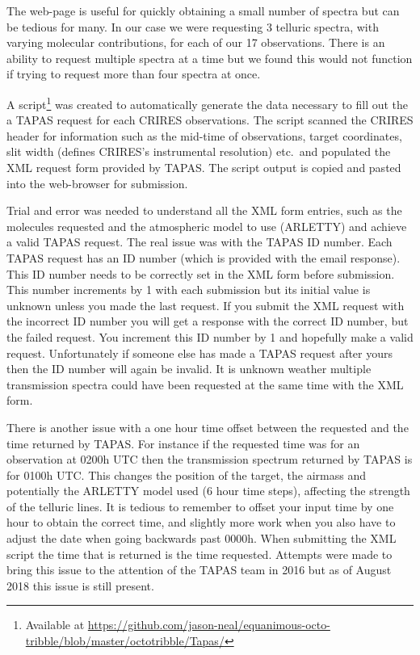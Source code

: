 The web-page is useful for quickly obtaining a small number of spectra but can be tedious for many. In our case we were requesting 3 telluric spectra, with varying molecular contributions, for each of our 17 observations. There is an ability to request multiple spectra at a time but we found this would not function if trying to request more than four spectra at once.

A script\footnote{Available at \href{https://github.com/jason-neal/equanimous-octo-tribble/blob/master/octotribble/Tapas/}{https://github.com/jason-neal/equanimous-octo-tribble/blob/master/octotribble/Tapas/}} was created to automatically generate the data necessary to fill out the a {TAPAS} request for each {CRIRES} observations. The script scanned the {CRIRES} header for information such as the mid-time of observations, target coordinates, slit width (defines {CRIRES}'s instrumental resolution) etc.\ and populated the {XML} request form provided by {TAPAS}. The script output is copied and pasted into the web-browser for submission.

Trial and error was needed to understand all the {XML} form entries, such as the molecules requested and the atmospheric model to use ({ARLETTY}) and achieve a valid {TAPAS} request. The real issue was with the {TAPAS} {{ID}} number. Each {TAPAS} request has an {ID} number (which is provided with the email response). This {ID} number needs to be correctly set in the {XML} form before submission. This number increments by 1 with each submission but its initial value is unknown unless you made the last request. If you submit the {XML} request with the incorrect {ID} number you will get a response with the correct {ID} number, but the failed request. You increment this {ID} number by 1 and hopefully make a valid request. Unfortunately if someone else has made a {TAPAS} request after yours then the {ID} number will again be invalid. It is unknown weather multiple transmission spectra could have been requested at the same time with the {XML} form.

There is another issue with a one hour time offset between the requested and the time returned by {TAPAS}. For instance if the requested time was for an observation at 0200h {UTC} then the transmission spectrum returned by {TAPAS} is for 0100h {UTC}. This changes the position of the target, the airmass and potentially the {ARLETTY} model used (6 hour time steps), affecting the strength of the telluric lines. It is tedious to remember to offset your input time by one hour to obtain the correct time, and slightly more work when you also have to adjust the date when going backwards past 0000h. When submitting the {XML} script the time that is returned is the time requested. Attempts were made to bring this issue to the attention of the {TAPAS} team in 2016 but as of August 2018 this issue is still present.


